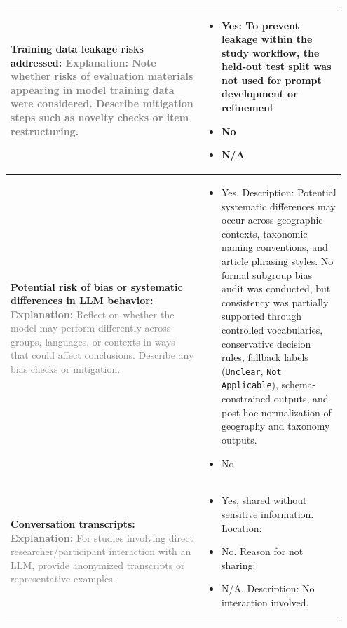 \documentclass[12pt]{article}
\newcommand{\checked}{\ding{110}}
\newcommand{\unchecked}{\ding{111}}
\begin{document}
\begin{landscape}
{\begin{longtable}{|p{0.55\linewidth}|p{0.40\linewidth}|}
\hline
\textbf{Training data leakage risks addressed:} \textcolor{gray}{\footnotesize \textbf{Explanation:} Note whether risks of evaluation materials appearing in model training data were considered. Describe mitigation steps such as novelty checks or item restructuring.} & \begin{itemize}[leftmargin=*]\setlength{\itemsep}{0pt} \item[\checked] Yes: To prevent leakage within the study workflow, the held-out test split was not used for prompt development or refinement \item[\unchecked] No \item[\unchecked] N/A \end{itemize} \\
\hline

\textbf{Potential risk of bias or systematic differences in LLM behavior:} \textcolor{gray}{\footnotesize \textbf{Explanation:} Reflect on whether the model may perform differently across groups, languages, or contexts in ways that could affect conclusions. Describe any bias checks or mitigation.} & \begin{itemize}[leftmargin=*]\setlength{\itemsep}{0pt} \item[\checked] Yes. Description: Potential systematic differences may occur across geographic contexts, taxonomic naming conventions, and article phrasing styles. No formal subgroup bias audit was conducted, but consistency was partially supported through controlled vocabularies, conservative decision rules, fallback labels (\texttt{Unclear}, \texttt{Not Applicable}), schema-constrained outputs, and post hoc normalization of geography and taxonomy outputs. \item[\unchecked] No \end{itemize} \\
\hline
\textbf{Conversation transcripts:} \textcolor{gray}{\footnotesize \textbf{Explanation:} For studies involving direct researcher/participant interaction with an LLM, provide anonymized transcripts or representative examples.} & \begin{itemize}[leftmargin=*]\setlength{\itemsep}{0pt} \item[\unchecked] Yes, shared without sensitive information. Location: \item[\unchecked] No. Reason for not sharing: \item[\checked] N/A. Description: No interaction involved. \end{itemize} \\
\hline


\end{longtable}}
\end{landscape}
\end{document}
